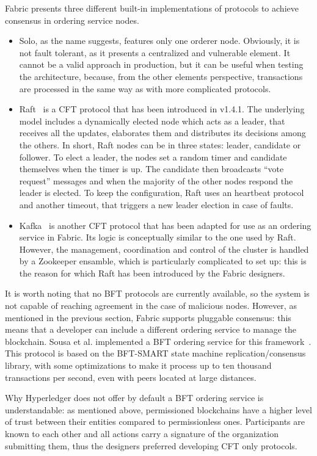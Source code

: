 Fabric presents three different built-in implementations of protocols to achieve consensus in ordering service nodes.
\begin{itemize}
    \item Solo, as the name suggests, features only one orderer node. Obviously, it is not fault tolerant, as it presents a centralized and vulnerable element. It cannot be a valid approach in production, but it can be useful when testing the architecture, because, from the other elements perspective, transactions are processed in the same way as with more complicated protocols. 
    \item Raft~\cite{raft} is a CFT protocol that has been introduced in v1.4.1. The underlying model includes a dynamically elected node which acts as a leader, that receives all the updates, elaborates them and distributes its decisions among the others. In short, Raft nodes can be in three states: leader, candidate or follower. To elect a leader, the nodes set a random timer and candidate themselves when the timer is up. The candidate then broadcasts ``vote request'' messages and when the majority of the other nodes respond the leader is elected. To keep the configuration, Raft uses an heartbeat protocol and another timeout, that triggers a new leader election in case of faults.
    \item Kafka~\cite{kafka} is another CFT protocol that has been adapted for use as an ordering service in Fabric. Its logic is conceptually similar to the one used by Raft. However, the management, coordination and control of the cluster is handled by a Zookeeper ensamble, which is particularly complicated to set up: this is the reason for which Raft has been introduced by the Fabric designers.
\end{itemize}

It is worth noting that no BFT protocols are currently available, so the system is not capable of reaching agreement in the case of malicious nodes. However, as mentioned in the previous section, Fabric supports pluggable consensus: this means that a developer can include a different ordering service to manage the blockchain. Sousa et al. implemented a BFT ordering service for this framework~\cite{bft_fabric}. This protocol is based on the BFT-SMART state machine replication/consensus library, with some optimizations to make it process up to ten thousand transactions per second, even with peers located at large distances. 

Why Hyperledger does not offer by default a BFT ordering service is understandable: as mentioned above, permissioned blockchains have a higher level of trust between their  entities compared to permissionless ones. Participants are known to each other and all actions carry a signature of the organization submitting them, thus the designers preferred developing CFT only protocols. 

